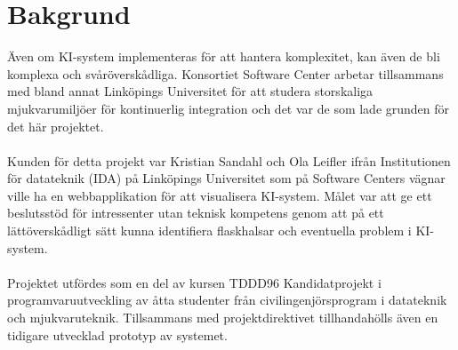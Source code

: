 
\chapter{Bakgrund}
\label{cha:background}
Även om KI-system implementeras för att hantera komplexitet, kan även de
bli komplexa och svåröverskådliga. Konsortiet Software Center arbetar tillsammans med
bland annat Linköpings Universitet för att studera storskaliga mjukvarumiljöer
för kontinuerlig integration och det var de som lade grunden för det här projektet.
\\ \\ 
Kunden för detta projekt var Kristian Sandahl och Ola Leifler ifrån Institutionen
för datateknik (IDA) på Linköpings Universitet som på Software Centers vägnar ville ha
en webbapplikation för att visualisera KI-system. Målet var att ge ett beslutsstöd
för intressenter utan teknisk kompetens genom att på ett lättöverskådligt
sätt kunna identifiera flaskhalsar och eventuella problem i KI-system.
\\ \\
Projektet utfördes som en del av kursen TDDD96 Kandidatprojekt i programvaruutveckling
av åtta studenter från civilingenjörsprogram i datateknik och mjukvaruteknik.
Tillsammans med projektdirektivet tillhandahölls även en tidigare utvecklad
prototyp av systemet.

